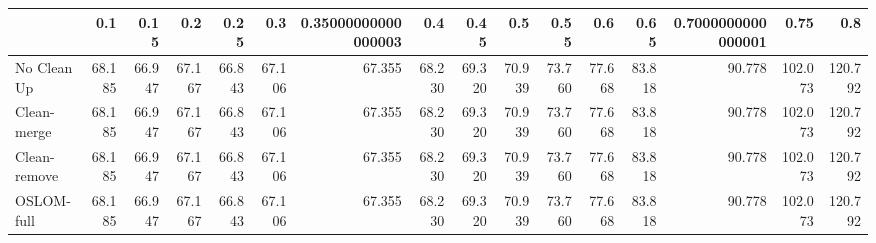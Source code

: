 \begin{tabular}{lrrrrrrrrrrrrrrr}
\toprule
{} &    0.1 &   0.15 &    0.2 &   0.25 &    0.3 & 0.35000000000000003 &    0.4 &   0.45 &    0.5 &   0.55 &    0.6 &   0.65 & 0.7000000000000001 &    0.75 &     0.8 \\
\midrule
No Clean Up  & 68.185 & 66.947 & 67.167 & 66.843 & 67.106 &              67.355 & 68.230 & 69.320 & 70.939 & 73.760 & 77.668 & 83.818 &             90.778 & 102.073 & 120.792 \\
Clean-merge  & 68.185 & 66.947 & 67.167 & 66.843 & 67.106 &              67.355 & 68.230 & 69.320 & 70.939 & 73.760 & 77.668 & 83.818 &             90.778 & 102.073 & 120.792 \\
Clean-remove & 68.185 & 66.947 & 67.167 & 66.843 & 67.106 &              67.355 & 68.230 & 69.320 & 70.939 & 73.760 & 77.668 & 83.818 &             90.778 & 102.073 & 120.792 \\
OSLOM-full   & 68.185 & 66.947 & 67.167 & 66.843 & 67.106 &              67.355 & 68.230 & 69.320 & 70.939 & 73.760 & 77.668 & 83.818 &             90.778 & 102.073 & 120.792 \\
\bottomrule
\end{tabular}
